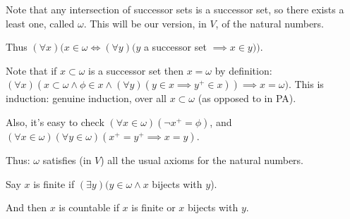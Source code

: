 \documentclass[a4paper]{article}
\begin{document}
Note that any intersection of successor sets is a successor set, so there exists a least one, called $\omega$. This will be our version, in $V$, of the natural numbers.

Thus $(\forall x)(x \in \omega \iff (\forall y)(y$ a successor set $\implies x \in y))$.

Note that if $x \subset \omega$ is a successor set then $x=\omega$ by definition:\\
$(\forall x)(x \subset \omega \wedge \phi \in x \wedge (\forall y)(y \in x \implies y^+ \in x)) \implies x=\omega)$. This is induction: genuine induction, over all $x \subset \omega$ (as opposed to in PA).

Also, it's easy to check $(\forall x \in \omega) (\neg x^+ = \phi)$, and $(\forall x \in \omega)(\forall y \in \omega)(x^+ = y^+ \implies x=y)$.

Thus: $\omega$ satisfies (in $V$) all the usual axioms for the natural numbers.

Say $x$ is finite if $(\exists y) (y \in \omega \wedge x$ bijects with $y$).

And then $x$ is countable if $x$ is finite or $x$ bijects with $y$.

\iffalse
\begin{equation*}
\begin{aligned}

\end{aligned}
\end{equation*}
\fi
\end{document}
